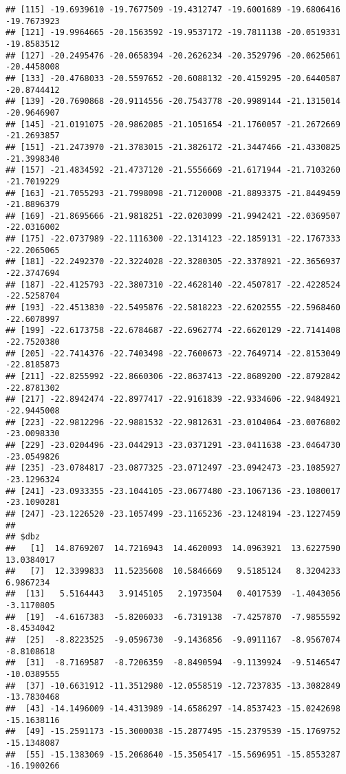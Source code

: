 \documentclass[
]{article}
\begin{document}
\begin{verbatim}
## [115] -19.6939610 -19.7677509 -19.4312747 -19.6001689 -19.6806416 -19.7673923
## [121] -19.9964665 -20.1563592 -19.9537172 -19.7811138 -20.0519331 -19.8583512
## [127] -20.2495476 -20.0658394 -20.2626234 -20.3529796 -20.0625061 -20.4458008
## [133] -20.4768033 -20.5597652 -20.6088132 -20.4159295 -20.6440587 -20.8744412
## [139] -20.7690868 -20.9114556 -20.7543778 -20.9989144 -21.1315014 -20.9646907
## [145] -21.0191075 -20.9862085 -21.1051654 -21.1760057 -21.2672669 -21.2693857
## [151] -21.2473970 -21.3783015 -21.3826172 -21.3447466 -21.4330825 -21.3998340
## [157] -21.4834592 -21.4737120 -21.5556669 -21.6171944 -21.7103260 -21.7019229
## [163] -21.7055293 -21.7998098 -21.7120008 -21.8893375 -21.8449459 -21.8896379
## [169] -21.8695666 -21.9818251 -22.0203099 -21.9942421 -22.0369507 -22.0316002
## [175] -22.0737989 -22.1116300 -22.1314123 -22.1859131 -22.1767333 -22.2065065
## [181] -22.2492370 -22.3224028 -22.3280305 -22.3378921 -22.3656937 -22.3747694
## [187] -22.4125793 -22.3807310 -22.4628140 -22.4507817 -22.4228524 -22.5258704
## [193] -22.4513830 -22.5495876 -22.5818223 -22.6202555 -22.5968460 -22.6078997
## [199] -22.6173758 -22.6784687 -22.6962774 -22.6620129 -22.7141408 -22.7520380
## [205] -22.7414376 -22.7403498 -22.7600673 -22.7649714 -22.8153049 -22.8185873
## [211] -22.8255992 -22.8660306 -22.8637413 -22.8689200 -22.8792842 -22.8781302
## [217] -22.8942474 -22.8977417 -22.9161839 -22.9334606 -22.9484921 -22.9445008
## [223] -22.9812296 -22.9881532 -22.9812631 -23.0104064 -23.0076802 -23.0098330
## [229] -23.0204496 -23.0442913 -23.0371291 -23.0411638 -23.0464730 -23.0549826
## [235] -23.0784817 -23.0877325 -23.0712497 -23.0942473 -23.1085927 -23.1296324
## [241] -23.0933355 -23.1044105 -23.0677480 -23.1067136 -23.1080017 -23.1090281
## [247] -23.1226520 -23.1057499 -23.1165236 -23.1248194 -23.1227459
## 
## $dbz
##   [1]  14.8769207  14.7216943  14.4620093  14.0963921  13.6227590  13.0384017
##   [7]  12.3399833  11.5235608  10.5846669   9.5185124   8.3204233   6.9867234
##  [13]   5.5164443   3.9145105   2.1973504   0.4017539  -1.4043056  -3.1170805
##  [19]  -4.6167383  -5.8206033  -6.7319138  -7.4257870  -7.9855592  -8.4534042
##  [25]  -8.8223525  -9.0596730  -9.1436856  -9.0911167  -8.9567074  -8.8108618
##  [31]  -8.7169587  -8.7206359  -8.8490594  -9.1139924  -9.5146547 -10.0389555
##  [37] -10.6631912 -11.3512980 -12.0558519 -12.7237835 -13.3082849 -13.7830468
##  [43] -14.1496009 -14.4313989 -14.6586297 -14.8537423 -15.0242698 -15.1638116
##  [49] -15.2591173 -15.3000038 -15.2877495 -15.2379539 -15.1769752 -15.1348087
##  [55] -15.1383069 -15.2068640 -15.3505417 -15.5696951 -15.8553287 -16.1900266

\end{verbatim}
\end{document}
